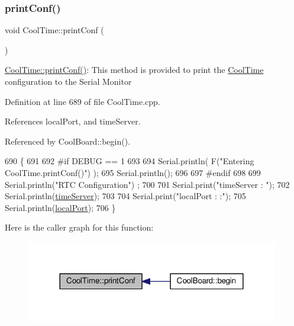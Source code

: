 \subsubsection{\texorpdfstring{print\+Conf()}{printConf()}}
{\footnotesize\ttfamily void Cool\+Time\+::print\+Conf (\begin{DoxyParamCaption}{ }\end{DoxyParamCaption})}

\hyperlink{classCoolTime_af355e7f9b3898211cd2ff25eab5933b1}{Cool\+Time\+::print\+Conf()}\+: This method is provided to print the \hyperlink{classCoolTime}{Cool\+Time} configuration to the Serial Monitor 

Definition at line 689 of file Cool\+Time.\+cpp.



References local\+Port, and time\+Server.



Referenced by Cool\+Board\+::begin().


\begin{DoxyCode}
690 \{
691 
692 \textcolor{preprocessor}{#if DEBUG == 1}
693 
694     Serial.println( F(\textcolor{stringliteral}{"Entering CoolTime.printConf()"}) );
695     Serial.println();
696 
697 \textcolor{preprocessor}{#endif }
698 
699     Serial.println(\textcolor{stringliteral}{"RTC Configuration"}) ;
700 
701     Serial.print(\textcolor{stringliteral}{"timeServer : "});
702     Serial.println(\hyperlink{classCoolTime_ad2b9858f399108cb440dd1e908916f04}{timeServer});
703     
704     Serial.print(\textcolor{stringliteral}{"localPort : :"});
705     Serial.println(\hyperlink{classCoolTime_a2f777da44d7ba678be8185299e9b49d1}{localPort});
706 \}
\end{DoxyCode}
Here is the caller graph for this function\+:
\nopagebreak
\begin{figure}[H]
\begin{center}
\leavevmode
\includegraphics[width=312pt]{classCoolTime_af355e7f9b3898211cd2ff25eab5933b1_icgraph}
\end{center}
\end{figure}
\mbox{\label{classCoolTime_ae9658c9b377510d469e3b88edf33ee85}} 
